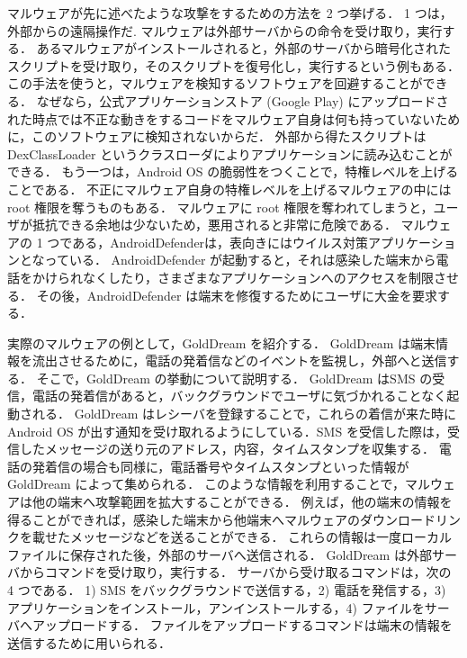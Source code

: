 マルウェアが先に述べたような攻撃をするための方法を 2 つ挙げる．
1 つは，外部からの遠隔操作だ\cite{remotectrl}.
マルウェアは外部サーバからの命令を受け取り，実行する．
あるマルウェアがインストールされると，外部のサーバから暗号化されたスクリプトを受け取り，そのスクリプトを復号化し，実行するという例もある．
この手法を使うと，マルウェアを検知するソフトウェアを回避することができる．
なぜなら，公式アプリケーションストア (Google Play)  にアップロードされた時点では不正な動きをするコードをマルウェア自身は何も持っていないために，このソフトウェアに検知されないからだ．
外部から得たスクリプトは DexClassLoader というクラスローダによりアプリケーションに読み込むことができる．
もう一つは，Android OS の脆弱性をつくことで，特権レベルを上げることである．
不正にマルウェア自身の特権レベルを上げるマルウェアの中には root 権限を奪うものもある．
マルウェアに root 権限を奪われてしまうと，ユーザが抵抗できる余地は少ないため，悪用されると非常に危険である．
マルウェアの 1 つである，AndroidDefender\cite{sopho}は，表向きにはウイルス対策アプリケーションとなっている．
AndroidDefender が起動すると，それは感染した端末から電話をかけられなくしたり，さまざまなアプリケーションへのアクセスを制限させる．
その後，AndroidDefender は端末を修復するためにユーザに大金を要求する．
 
実際のマルウェアの例として，GoldDream を紹介する．
GoldDream は端末情報を流出させるために，電話の発着信などのイベントを監視し，外部へと送信する．
そこで，GoldDream の挙動について説明する．
GoldDream はSMS の受信，電話の発着信があると，バックグラウンドでユーザに気づかれることなく起動される．
GoldDream はレシーバを登録することで，これらの着信が来た時に Android OS が出す通知を受け取れるようにしている．SMS を受信した際は，受信したメッセージの送り元のアドレス，内容，タイムスタンプを収集する．
電話の発着信の場合も同様に，電話番号やタイムスタンプといった情報が GoldDream によって集められる．
このような情報を利用することで，マルウェアは他の端末へ攻撃範囲を拡大することができる．
例えば，他の端末の情報を得ることができれば，感染した端末から他端末へマルウェアのダウンロードリンクを載せたメッセージなどを送ることができる．
これらの情報は一度ローカルファイルに保存された後，外部のサーバへ送信される．
GoldDream は外部サーバからコマンドを受け取り，実行する．
サーバから受け取るコマンドは，次の 4 つである．
1) SMS をバックグラウンドで送信する，2) 電話を発信する，3) アプリケーションをインストール，アンインストールする，4) ファイルをサーバへアップロードする． 
ファイルをアップロードするコマンドは端末の情報を送信するために用いられる．



